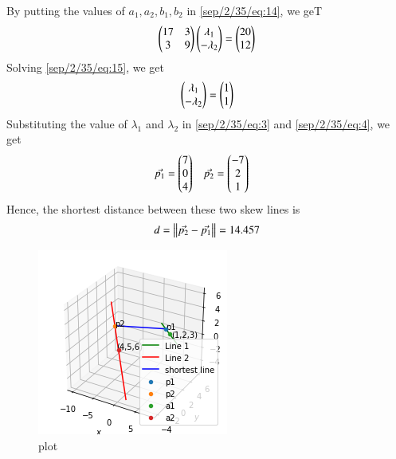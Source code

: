 By putting the values of $a_{1},a_{2},b_{1},b_{2}$ in \eqref{sep/2/35/eq:14}, we geT
\begin{align}
    \label{sep/2/35/eq:15}
    \begin{pmatrix}17 & 3 \\ 3 & 9\end{pmatrix}\begin{pmatrix}\lambda_{1} \\ -\lambda_{2}\end{pmatrix}=\begin{pmatrix}20 \\ 12\end{pmatrix}
\end{align}
Solving \eqref{sep/2/35/eq:15}, we get
\begin{align}
    \label{sep/2/35/eq:16}
    \begin{pmatrix}\lambda_{1} \\ -\lambda_{2}\end{pmatrix}=\begin{pmatrix}1 \\ 1\end{pmatrix}
\end{align}
Substituting the value of $\lambda_{1}$ and $\lambda_{2}$ in \eqref{sep/2/35/eq:3} and \eqref{sep/2/35/eq:4}, we get
\begin{align}
    \label{sep/2/35/eq:17}
    \Vec{p_{1}} &= \begin{pmatrix}7 \\ 0 \\ 4 \end{pmatrix}   &    \Vec{p_{2}}&=\begin{pmatrix} -7\\ 2\\ 1\end{pmatrix}
\end{align}
Hence, the shortest distance between these two skew lines is
\begin{align}
    \label{sep/2/35/eq:18}
    d = \left\lVert\Vec{p_{2}}-\Vec{p_{1}}\right\rVert = 14.457
\end{align}

\begin{figure}[htp]
    \centering
    \includegraphics[width=\columnwidth]{solutions/sep/2/35/Figure/AS4.png}
    \caption{plot}
    \label{sep/2/35/fig:my_label}
\end{figure}

